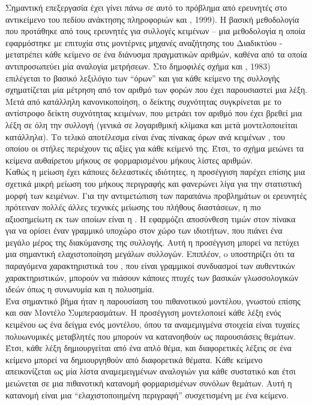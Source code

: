 Σημαντική επεξεργασία έχει γίνει πάνω σε αυτό το πρόβλημα από ερευνητές στο
αντικείμενο του πεδίου ανάκτησης πληροφοριών {} και {}, 1999).
Η βασική μεθοδολογία που προτάθηκε από τους {} ερευνητές για συλλογές κειμένων – μια
μεθοδολογία η οποία εφαρμόστηκε με επιτυχία στις μοντέρνες μηχανές αναζήτησης του
Διαδικτύου - μετατρέπει κάθε κείμενο σε ένα διάνυσμα πραγματικών αριθμών, καθένα από
τα οποία αντιπροσωπεύει μία αναλογία μετρήσεων. Στο δημοφιλές \textbf{{}} σχήμα {} και
{}, 1983) επιλέγεται το βασικό λεξιλόγιο των “όρων” και για κάθε
κείμενο της συλλογής σχηματίζεται μία μέτρηση από τον αριθμό των φορών που έχει
παρουσιαστεί μια λέξη. Μετά από κατάλληλη κανονικοποίηση, ο δείκτης συχνότητας
συγκρίνεται με το αντίστροφο δείκτη συχνότητας κειμένων, που μετράει τον αριθμό που
έχει βρεθεί μια λέξη σε όλη την συλλογή (γενικά σε λογαριθμική κλίμακα και μετά
μοντελοποιείται κατάλληλα). Το τελικό αποτέλεσμα είναι ένας πίνακας όρων ανά κειμένων
{}, του οποίου οι στήλες περιέχουν τις {} αξίες για κάθε κείμενό της. 
Έτσι, το {} σχήμα μειώνει τα κείμενα αυθαίρετου μήκους σε φορμαρισμένου μήκους λίστες αριθμών. \\

Καθώς η {} μείωση έχει κάποιες δελεαστικές ιδιότητες,
η προσέγγιση παρέχει επίσης μια σχετικά μικρή μείωση του μήκους περιγραφής 
και φανερώνει λίγα για την στατιστική μορφή των κειμένων. 
Για την αντιμετώπιση των παραπάνω προβλημάτων οι {} ερευνητές
πρότειναν πολλές άλλες τεχνικές μείωσης του πλήθους διαστάσεων, η πιο αξιοσημείωτη εκ
των οποίων είναι η \textbf{{}} {}. H {}
εφαρμόζει αποσύνθεση τιμών στον {} πίνακα για να ορίσει έναν γραμμικό υποχώρο στον 
χώρο των {} ιδιοτήτων, που πιάνει ένα μεγάλο μέρος της διακύμανσης της συλλογής.
Αυτή η προσέγγιση μπορεί να πετύχει μια σημαντική ελαχιστοποίηση μεγάλων συλλογών.
Επιπλέον, o {} υποστηρίζει ότι τα παραγόμενα χαρακτηριστικά του {}, που
είναι γραμμικοί συνδυασμοί των αυθεντικών {} χαρακτηριστικών, μπορούν να πιάσουν
κάποιες πτυχές των βασικών γλωσσολογικών ιδεών όπως η συνωνυμία και η πολυσημία. \\

Ένα σημαντικό βήμα ήταν η παρουσίαση του πιθανοτικού {}
μοντέλου, γνωστού επίσης και σαν Μοντέλο Συμπερασμάτων. H {} προσέγγιση
μοντελοποιεί κάθε λέξη ενός κειμένου ως ένα δείγμα ενός {} μοντέλου, όπου τα
αναμεμιγμένα στοιχεία είναι τυχαίες πολυωνυμικές μεταβλητές που μπορούν να
κατανοηθούν ως παρουσιάσεις θεμάτων. Έτσι, κάθε λέξη δημιουργείται από ένα απλό θέμα,
και διαφορετικές λέξεις σε ένα κείμενο μπορεί να δημιουργηθούν από διαφορετικά θέματα.
Κάθε κείμενο απεικονίζεται ως μία λίστα αναμεμειγμένων αναλογιών για κάθε {}
συστατικό και έτσι μειώνεται σε μια πιθανοτική κατανομή φορμαρισμένων συνόλων
θεμάτων. Αυτή η κατανομή είναι μια “ελαχιστοποιημένη περιγραφή” συσχετισμένη με ένα
κείμενο. \\


